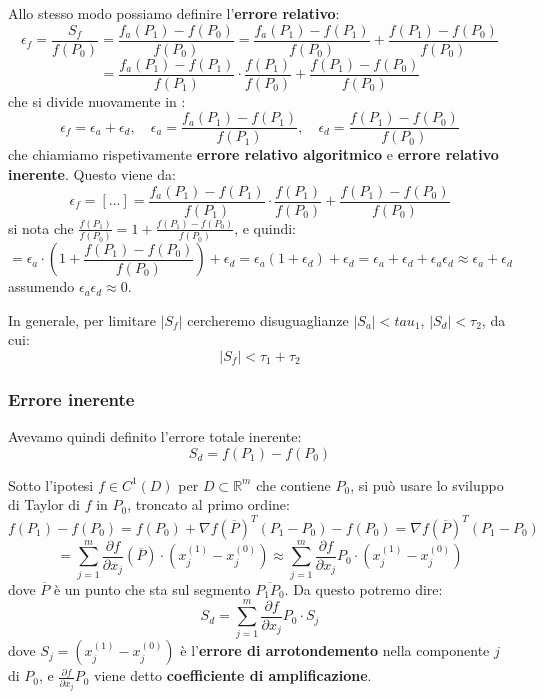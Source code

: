 \documentclass[a4paper,11pt]{article}
\begin{document}
Allo stesso modo possiamo definire l'\textbf{errore relativo}:
$$
\epsilon_f = \frac{S_f}{f(P_0)} = \frac{f_a(P_1) - f(P_0)}{f(P_0)} = \frac{f_a(P_1) - f(P_1)}{f(P_0)} + \frac{f(P_1) - f(P_0)}{f(P_0)}
$$
$$
= \frac{f_a(P_1) - f(P_1)}{f(P_1)} \cdot \frac{f(P_1)}{f(P_0)} + \frac{f(P_1) - f(P_0)}{f(P_0)} 
$$
che si divide nuovamente in :
$$
\epsilon_f = \epsilon_a + \epsilon_d, \quad \epsilon_a = \frac{f_a(P_1) - f(P_1)}{f(P_1)}, \quad \epsilon_d = \frac{f(P_1) - f(P_0)}{f(P_0)}
$$
che chiamiamo rispetivamente \textbf{errore relativo algoritmico} e \textbf{errore relativo inerente}.
Questo viene da:
$$
\epsilon_f = [...] = \frac{f_a(P_1) - f(P_1)}{f(P_1)} \cdot \frac{f(P_1)}{f(P_0)} + \frac{f(P_1) - f(P_0)}{f(P_0)} 
$$
si nota che $\frac{f(P_1)}{f(P_0)} = 1 + \frac{f(P_1) - f(P_0)}{f(P_0)}$, e quindi:
$$
= \epsilon_a \cdot \left( 1 + \frac{f(P_1) - f(P_0)}{f(P_0)} \right) + \epsilon_d = \epsilon_a(1 + \epsilon_d) + \epsilon_d = \epsilon_a + \epsilon_d + \epsilon_a \epsilon_d \approx \epsilon_a + \epsilon_d
$$
assumendo $\epsilon_a \epsilon_d \approx 0$.

\par\smallskip

In generale, per limitare $|S_f|$ cercheremo disuguaglianze $|S_a| < tau_1$, $|S_d| < \tau_2$, da cui:
$$
	|S_f| < \tau_1 + \tau_2
$$

\subsubsection{Errore inerente}
Avevamo quindi definito l'errore totale inerente:
$$
S_d = f(P_1) - f(P_0)
$$

Sotto l'ipotesi $f \in C^1(D)$ per $D \subset \mathbb{R}^m$ che contiene $P_0$, si può usare  lo sviluppo di Taylor di $f$ in $P_0$, troncato al primo ordine:
$$
f(P_1) - f(P_0) = f(P_0) + \nabla f(\overline{P})^T (P_1 - P_0) - f(P_0) = \nabla f(\overline{P})^T (P_1 - P_0)
$$
$$
= \sum_{j=1}^m \frac{\partial f}{\partial x_j}(\overline{P}) \cdot \left(x_j^{(1)} - x_j^{(0)}\right)
\approx \sum_{j=1}^m \frac{\partial f}{\partial x_j}{P_0} \cdot \left(x_j^{(1)} - x_j^{(0)}\right)
$$
dove $\overline{P}$ è un punto che sta sul segmento $\overline{P_1 P_0}$.
Da questo potremo dire:
$$
S_d = \sum_{j=1}^m \frac{\partial f}{\partial x_j}{P_0} \cdot S_j
$$
dove $S_j = \left(x_j^{(1)} - x_j^{(0)}\right)$ è l'\textbf{errore di arrotondemento} nella componente $j$ di $P_0$, e $\frac{\partial f}{\partial x_j}{P_0}$ viene detto \textbf{coefficiente di amplificazione}.

\par\smallskip
\end{document}
